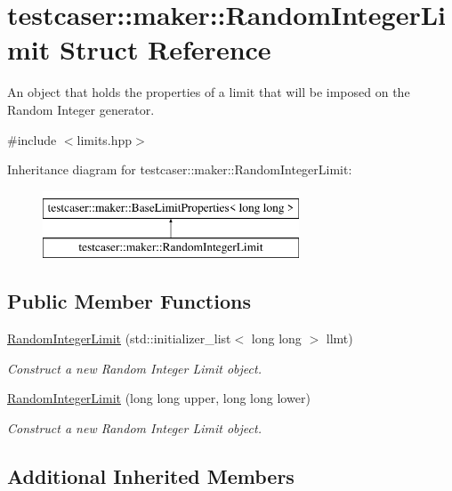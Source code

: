 \hypertarget{structtestcaser_1_1maker_1_1RandomIntegerLimit}{}\section{testcaser\+:\+:maker\+:\+:Random\+Integer\+Limit Struct Reference}
\label{structtestcaser_1_1maker_1_1RandomIntegerLimit}


An object that holds the properties of a limit that will be imposed on the Random Integer generator.  




{\ttfamily \#include $<$limits.\+hpp$>$}

Inheritance diagram for testcaser\+:\+:maker\+:\+:Random\+Integer\+Limit\+:\begin{figure}[H]
\begin{center}
\leavevmode
\includegraphics[height=2.000000cm]{structtestcaser_1_1maker_1_1RandomIntegerLimit}
\end{center}
\end{figure}
\subsection*{Public Member Functions}
\begin{DoxyCompactItemize}
\item 
\mbox{\hyperlink{structtestcaser_1_1maker_1_1RandomIntegerLimit_ae70b7c715a632c4a079a0c37452decbf}{Random\+Integer\+Limit}} (std\+::initializer\+\_\+list$<$ long long $>$ llmt)
\begin{DoxyCompactList}\small\item\em Construct a new Random Integer Limit object. \end{DoxyCompactList}\item 
\mbox{\hyperlink{structtestcaser_1_1maker_1_1RandomIntegerLimit_a43781197d959fc8ab6cf54258df35a64}{Random\+Integer\+Limit}} (long long upper, long long lower)
\begin{DoxyCompactList}\small\item\em Construct a new Random Integer Limit object. \end{DoxyCompactList}\end{DoxyCompactItemize}
\subsection*{Additional Inherited Members}


